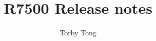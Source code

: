 \documentclass[12pt]{report}
\newcommand{\ispnpedf}{\mbox{ISP-NPEDF}}
\begin{document}
\title{R7500 Release notes}

\author{\normalsize{Torby Tong}}

\maketitle
\thispagestyle{empty}





\psfull
\tableofcontents
\thispagestyle{empty}
\newpage
\setcounter{page}{1}
\end{document}
